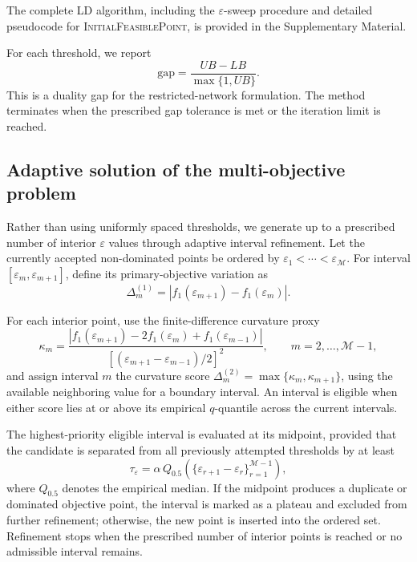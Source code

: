 \documentclass[preprint,11pt,authoryear]{elsarticle}
\begin{document}
The complete LD algorithm, including the $\varepsilon$-sweep procedure and
detailed pseudocode for \textsc{InitialFeasiblePoint}, is provided in the
Supplementary Material.

For each threshold, we report
\begin{equation}
\mathrm{gap}
=
\frac{UB-LB}{\max\{1,UB\}}.
\label{LR:reported_gap}
\end{equation}
This is a duality gap for the restricted-network formulation. The method
terminates when the prescribed gap tolerance is met or the iteration limit is
reached.


\subsection{Adaptive solution of the multi-objective problem}
\label{sec:adaptive_multiobjective}
Rather than using uniformly spaced thresholds, we generate up to a prescribed
number of interior $\varepsilon$ values through adaptive interval refinement.
Let the currently accepted non-dominated points be ordered by
$\varepsilon_1<\cdots<\varepsilon_{\mathcal M}$. For interval
$[\varepsilon_m,\varepsilon_{m+1}]$, define its primary-objective variation as
\[
\Delta_m^{(1)}
=
\left|
f_1(\varepsilon_{m+1})-f_1(\varepsilon_m)
\right|.
\]

For each interior point, use the finite-difference curvature proxy
\[
\kappa_m
=
\frac{
\left|
f_1(\varepsilon_{m+1})
-2f_1(\varepsilon_m)
+f_1(\varepsilon_{m-1})
\right|
}{
[(\varepsilon_{m+1}-\varepsilon_{m-1})/2]^2
},
\qquad
m=2,\ldots,\mathcal M-1,
\]
and assign interval $m$ the curvature score
$\Delta_m^{(2)}=\max\{\kappa_m,\kappa_{m+1}\}$, using the available
neighboring value for a boundary interval. An interval is eligible when
either score lies at or above its empirical $q$-quantile across the current
intervals.

The highest-priority eligible interval is evaluated at its midpoint, provided
that the candidate is separated from all previously attempted thresholds by
at least
\[
\tau_\varepsilon
=
\alpha\,Q_{0.5}
\left(
\{\varepsilon_{r+1}-\varepsilon_r\}_{r=1}^{\mathcal M-1}
\right),
\]
where $Q_{0.5}$ denotes the empirical median. If the midpoint produces a
duplicate or dominated objective point, the interval is marked as a plateau
and excluded from further refinement; otherwise, the new point is inserted
into the ordered set. Refinement stops when the prescribed number of interior
points is reached or no admissible interval remains. 
\end{document}
